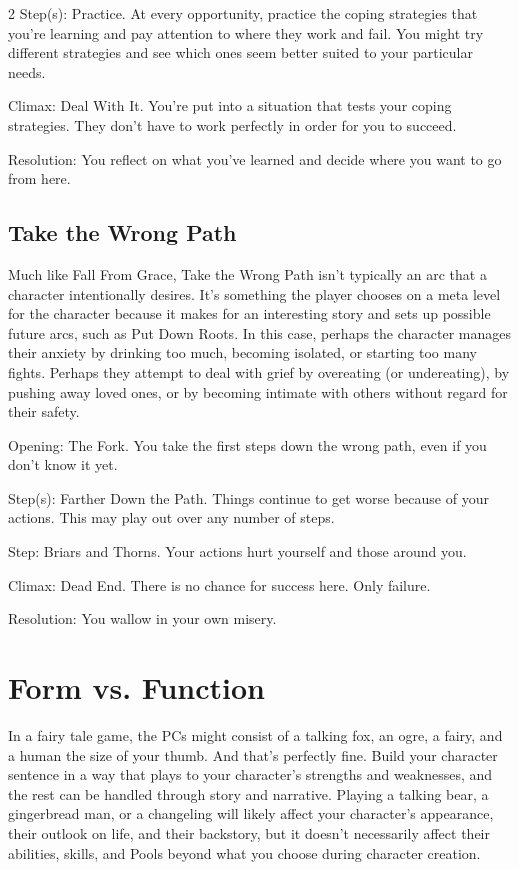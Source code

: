 \begin{multicols}{2}
Step(s): Practice. At every opportunity, practice the coping strategies that you’re learning and pay attention to where they work and fail. You might try different strategies and see which ones seem better suited to your particular needs.

Climax: Deal With It. You’re put into a situation that tests your coping strategies. They don’t have to work perfectly in order for you to succeed.

Resolution: You reflect on what you’ve learned and decide where you want to go from here.

\subsection{Take the Wrong Path}

Much like Fall From Grace, Take the Wrong Path isn’t typically an arc that a character intentionally desires. It’s something the player chooses on a meta level for the character because it makes for an interesting story and sets up possible future arcs, such as Put Down Roots. In this case, perhaps the character manages their anxiety by drinking too much, becoming isolated, or starting too many fights. Perhaps they attempt to deal with grief by overeating (or undereating), by pushing away loved ones, or by becoming intimate with others without regard for their safety.

Opening: The Fork. You take the first steps down the wrong path, even if you don’t know it yet.

Step(s): Farther Down the Path. Things continue to get worse because of your actions. This may play out over any number of steps.

Step: Briars and Thorns. Your actions hurt yourself and those around you.

Climax: Dead End. There is no chance for success here. Only failure.

Resolution: You wallow in your own misery.

\section{Form vs. Function}

In a fairy tale game, the PCs might consist of a talking fox, an ogre, a fairy, and a human the size of your thumb. And that’s perfectly fine. Build your character sentence in a way that plays to your character’s strengths and weaknesses, and the rest can be handled through story and narrative. Playing a talking bear, a gingerbread man, or a changeling will likely affect your character’s appearance, their outlook on life, and their backstory, but it doesn’t necessarily affect their abilities, skills, and Pools beyond what you choose during character creation.


\end{multicols}
